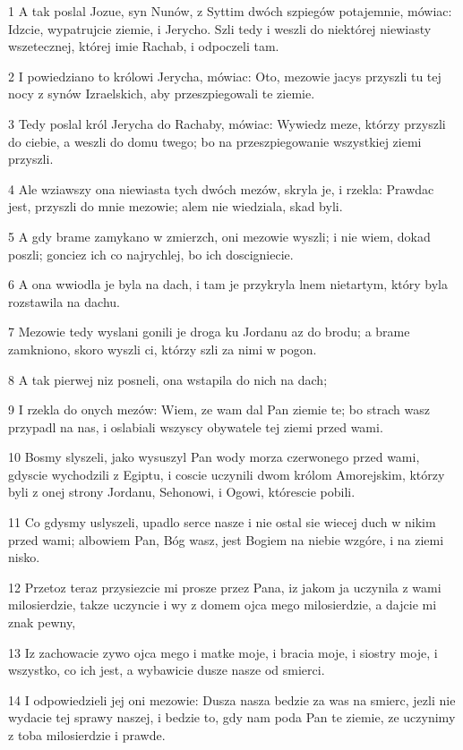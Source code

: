 \par 1 A tak poslal Jozue, syn Nunów, z Syttim dwóch szpiegów potajemnie, mówiac: Idzcie, wypatrujcie ziemie, i Jerycho. Szli tedy i weszli do niektórej niewiasty wszetecznej, której imie Rachab, i odpoczeli tam.
\par 2 I powiedziano to królowi Jerycha, mówiac: Oto, mezowie jacys przyszli tu tej nocy z synów Izraelskich, aby przeszpiegowali te ziemie.
\par 3 Tedy poslal król Jerycha do Rachaby, mówiac: Wywiedz meze, którzy przyszli do ciebie, a weszli do domu twego; bo na przeszpiegowanie wszystkiej ziemi przyszli.
\par 4 Ale wziawszy ona niewiasta tych dwóch mezów, skryla je, i rzekla: Prawdac jest, przyszli do mnie mezowie; alem nie wiedziala, skad byli.
\par 5 A gdy brame zamykano w zmierzch, oni mezowie wyszli; i nie wiem, dokad poszli; gonciez ich co najrychlej, bo ich doscigniecie.
\par 6 A ona wwiodla je byla na dach, i tam je przykryla lnem nietartym, który byla rozstawila na dachu.
\par 7 Mezowie tedy wyslani gonili je droga ku Jordanu az do brodu; a brame zamkniono, skoro wyszli ci, którzy szli za nimi w pogon.
\par 8 A tak pierwej niz posneli, ona wstapila do nich na dach;
\par 9 I rzekla do onych mezów: Wiem, ze wam dal Pan ziemie te; bo strach wasz przypadl na nas, i oslabiali wszyscy obywatele tej ziemi przed wami.
\par 10 Bosmy slyszeli, jako wysuszyl Pan wody morza czerwonego przed wami, gdyscie wychodzili z Egiptu, i coscie uczynili dwom królom Amorejskim, którzy byli z onej strony Jordanu, Sehonowi, i Ogowi, którescie pobili.
\par 11 Co gdysmy uslyszeli, upadlo serce nasze i nie ostal sie wiecej duch w nikim przed wami; albowiem Pan, Bóg wasz, jest Bogiem na niebie wzgóre, i na ziemi nisko.
\par 12 Przetoz teraz przysiezcie mi prosze przez Pana, iz jakom ja uczynila z wami milosierdzie, takze uczyncie i wy z domem ojca mego milosierdzie, a dajcie mi znak pewny,
\par 13 Iz zachowacie zywo ojca mego i matke moje, i bracia moje, i siostry moje, i wszystko, co ich jest, a wybawicie dusze nasze od smierci.
\par 14 I odpowiedzieli jej oni mezowie: Dusza nasza bedzie za was na smierc, jezli nie wydacie tej sprawy naszej, i bedzie to, gdy nam poda Pan te ziemie, ze uczynimy z toba milosierdzie i prawde.
